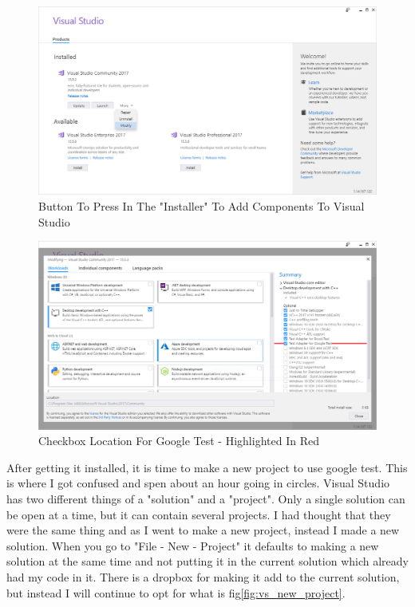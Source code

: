 \documentclass[12pt]{article}
\begin{document}
\begin{figure}[ht]
	\centering
	\includegraphics[width=\textwidth]{modify_button.png}
	\caption{Button To Press In The "Installer" To Add Components To Visual Studio}
	\label{fig:modify_button}
\end{figure}

\begin{figure}[ht]
	\centering
	\includegraphics[width=\textwidth]{google_test_plugin.png}
	\caption{Checkbox Location For Google Test - Highlighted In Red}
	\label{fig:google_test_plugin}
\end{figure}

After getting it installed, it is time to make a new project to use google test.
This is where I got confused and spen about an hour going in circles.
Visual Studio has two different things of a "solution" and a "project".
Only a single solution can be open at a time, but it can contain several projects.
I had thought that they were the same thing and as I went to make a new project, instead I made a new solution.
When you go to "File - New - Project" it defaults to making a new solution at the same time and not putting it in the current solution which already had my code in it.
There is a dropbox for making it add to the current solution, but instead I will continue to opt for what is fig\ref{fig:vs_new_project}.
\end{document}
